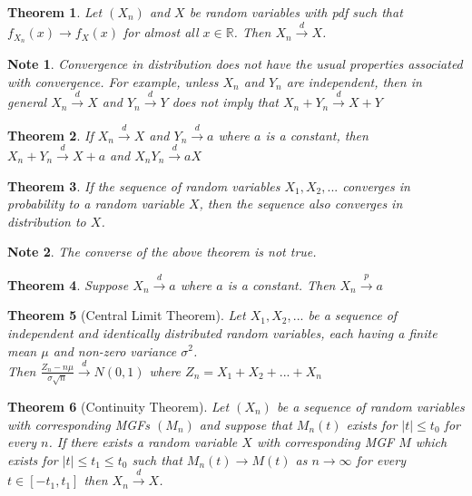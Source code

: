 \documentclass[14pt,twoside]{extreport}
\theoremstyle{dotless}
\newtheorem*{thm}{\footnotesize Theorem} %
\newtheorem*{note}{\footnotesize Note} %
\begin{document}
\begin{thm}
    Let $(X_n)$ and $X$ be random variables with pdf such that $f_{X_n}(x) \to f_X(x)$ for almost all $x \in \mathbb{R}$. 
    Then $X_n \overset{d}{\to} X$.
\end{thm}

\begin{note}
    Convergence in distribution does not have the usual properties associated with convergence. For example, unless $X_n$ and $Y_n$ are independent, then in general $X_n \overset{d}{\to} X$ and $Y_n \overset{d}{\to} Y$ does not imply that $X_n + Y_n \overset{d}{\to} X + Y$
\end{note}

\begin{thm}
    If $X_n \overset{d}{\to} X$ and $Y_n \overset{d}{\to} a$ where $a$ is a constant, then $X_n + Y_n \overset{d}{\to} X + a$ and $X_n Y_n \overset{d}{\to} aX$
\end{thm}

\begin{thm}
    If the sequence of random variables $X_1, X_2, ...$ converges in probability to a random variable $X$, then the sequence also converges in distribution to $X$.
\end{thm}

\begin{note}
    The converse of the above theorem is not true.
\end{note}

\begin{thm}
    Suppose $X_n \overset{d}{\to} a$ where $a$ is a constant. Then $X_n \overset{p}{\to} a$
\end{thm}

\begin{thm}[Central Limit Theorem]
    Let $X_1, X_2, ...$ be a sequence of independent and identically distributed random variables, each having a finite mean $\mu$ and non-zero variance $\sigma^2$. 
    \\Then $\frac{Z_n - n \mu}{\sigma \sqrt{n}} \overset{d}{\to} N(0,1)$ where $Z_n = X_1 + X_2 + ... + X_n$
\end{thm}

\begin{thm}[Continuity Theorem]
    Let $(X_n)$ be a sequence of random variables with corresponding MGFs $(M_n)$ and suppose that $M_n(t)$ exists for $|t| \leq t_0$ for every $n$. If there exists a random variable $X$ with corresponding MGF $M$ which exists for $|t| \leq t_1 \leq t_0$ such that $M_n(t) \to M(t)$ as $n \to \infty$ for every $t \in [-t_1, t_1]$ then $X_n \overset{d}{\to} X$.
\end{thm}
\end{document}

